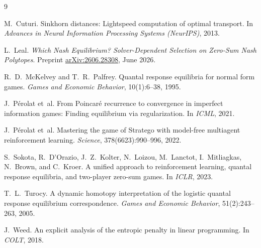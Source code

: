 \documentclass[11pt]{article}
\theoremstyle{plain}
\theoremstyle{definition}
\theoremstyle{remark}
\begin{document}
\begin{thebibliography}{9}

M.~Cuturi.
Sinkhorn distances: Lightspeed computation of optimal transport.
In \emph{Advances in Neural Information Processing Systems (NeurIPS)}, 2013.

L.~Leal.
\emph{Which Nash Equilibrium? Solver-Dependent Selection on Zero-Sum Nash Polytopes}.
Preprint \href{https://arxiv.org/abs/2606.28308}{arXiv:2606.28308}, June 2026.

R.~D.~McKelvey and T.~R.~Palfrey.
Quantal response equilibria for normal form games.
\emph{Games and Economic Behavior}, 10(1):6--38, 1995.

J.~P\'erolat et~al.
From Poincar\'e recurrence to convergence in imperfect information games: Finding equilibrium via regularization.
In \emph{ICML}, 2021.

J.~P\'erolat et~al.
Mastering the game of Stratego with model-free multiagent reinforcement learning.
\emph{Science}, 378(6623):990--996, 2022.

S.~Sokota, R.~D'Orazio, J.~Z.~Kolter, N.~Loizou, M.~Lanctot, I.~Mitliagkas, N.~Brown, and C.~Kroer.
A unified approach to reinforcement learning, quantal response equilibria, and two-player zero-sum games.
In \emph{ICLR}, 2023.

T.~L.~Turocy.
A dynamic homotopy interpretation of the logistic quantal response equilibrium correspondence.
\emph{Games and Economic Behavior}, 51(2):243--263, 2005.

J.~Weed.
An explicit analysis of the entropic penalty in linear programming.
In \emph{COLT}, 2018.

\end{thebibliography}
\end{document}
